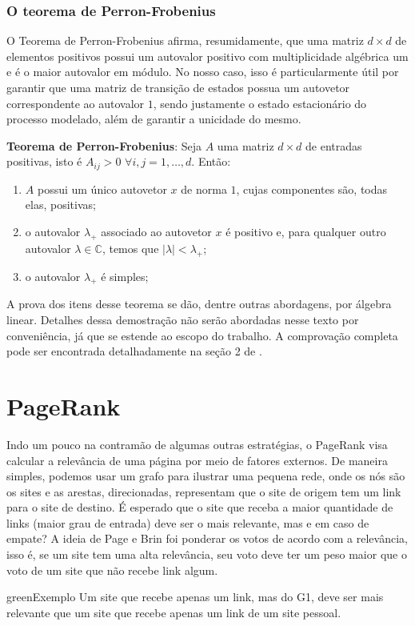 \documentclass{article}
\begin{document}
\subsubsection*{O teorema de Perron-Frobenius}

O Teorema de Perron-Frobenius afirma, resumidamente, que uma matriz $d \times d$ de elementos positivos possui um autovalor positivo com multiplicidade algébrica um e é o maior autovalor em módulo. No nosso caso, isso é particularmente útil por garantir que uma matriz de transição de estados possua um autovetor correspondente ao autovalor $1$, sendo justamente o estado estacionário do processo modelado, além de garantir a unicidade do mesmo.

\noindent
\textbf{Teorema de Perron-Frobenius}: Seja $A$ uma matriz $d \times d$ de entradas positivas, isto é $A_{ij}>0$ $\forall i, j = 1, \dots, d$. Então:

\begin{enumerate}
    \item $A$ possui um único autovetor $x$ de norma $1$, cujas componentes são, todas elas, positivas;
    \item o autovalor $\lambda_+$ associado ao autovetor $x$ é positivo e, para qualquer outro autovalor $\lambda \in \mathbb{C}$, temos que $|\lambda| < \lambda_+$;
    \item o autovalor $\lambda_+$ é simples;
\end{enumerate}

A prova dos itens desse teorema se dão, dentre outras abordagens, por álgebra linear. Detalhes dessa demostração não serão abordadas nesse texto por conveniência, já que se estende ao escopo do trabalho. A comprovação completa pode ser encontrada detalhadamente na seção 2 de \cite{perron-frobenius}.

\section*{PageRank}

Indo um pouco na contramão de algumas outras estratégias, o PageRank visa calcular a relevância de uma página por meio de fatores externos. De maneira simples, podemos usar um grafo para ilustrar uma pequena rede, onde os nós são os sites e as arestas, direcionadas, representam que o site de origem tem um link para o site de destino. É esperado que o site que receba a maior quantidade de links (maior grau de entrada) deve ser o mais relevante, mas e em caso de empate? A ideia de Page e Brin foi ponderar os votos de acordo com a relevância, isso é, se um site tem uma alta relevância, seu voto deve ter um peso maior que o voto de um site que não recebe link algum.
\begin{mybox}{green}{Exemplo}
    Um site que recebe apenas um link, mas do G1, deve ser mais relevante que um site que recebe apenas um link de um site pessoal.
\end{mybox}
\end{document}
